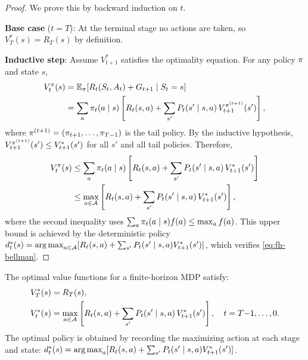 \documentclass[11pt,a4paper]{article}
\begin{document}
\begin{proof}
We prove this by backward induction on $t$.

\textbf{Base case} ($t = T$): At the terminal stage no actions are
taken, so $V_T^*(s) = R_T(s)$ by definition.

\textbf{Inductive step}: Assume $V_{t+1}^*$ satisfies the optimality
equation. For any policy $\pi$ and state $s$,
\begin{align*}
    V_t^\pi(s)
    &= \mathbb{E}_\pi[R_t(S_t, A_t) + G_{t+1} \mid S_t = s] \\
    &= \sum_{a} \pi_t(a \mid s) \left[ R_t(s,a)
       + \sum_{s'} P_t(s' \mid s,a)\,
       V_{t+1}^{\pi^{(t+1)}}(s') \right],
\end{align*}
where $\pi^{(t+1)} = (\pi_{t+1}, \ldots, \pi_{T-1})$ is
the tail policy. By the inductive hypothesis,
$V_{t+1}^{\pi^{(t+1)}}(s') \leq V_{t+1}^*(s')$ for all $s'$
and all tail policies. Therefore,
\begin{align*}
    V_t^\pi(s)
    &\leq \sum_{a} \pi_t(a \mid s) \left[ R_t(s,a)
       + \sum_{s'} P_t(s' \mid s,a)\, V_{t+1}^*(s') \right] \\
    &\leq \max_{a \in \mathcal{A}} \left[ R_t(s,a)
       + \sum_{s'} P_t(s' \mid s,a)\, V_{t+1}^*(s') \right],
\end{align*}
where the second inequality uses
$\sum_a \pi_t(a \mid s) f(a) \leq \max_a f(a)$. This upper
bound is achieved by the deterministic policy
$d_t^*(s) = \operatorname{arg\,max}_{a \in \mathcal{A}} [R_t(s,a) + \sum_{s'}
P_t(s' \mid s,a) V_{t+1}^*(s')]$, which verifies
\eqref{eq:fh-bellman}.
\end{proof}

\begin{keyresult}[title={Finite-Horizon Bellman Optimality Recursion}]
The optimal value functions for a finite-horizon MDP satisfy:
\begin{align*}
    V_T^*(s) &= R_T(s), \\
    V_t^*(s) &= \max_{a \in \mathcal{A}} \left[ R_t(s,a) + \sum_{s'}
    P_t(s' \mid s,a)\, V_{t+1}^*(s') \right],
    \quad t = T{-}1, \ldots, 0.
\end{align*}
The optimal policy is obtained by recording the maximizing action at
each stage and state: $d_t^*(s) = \operatorname{arg\,max}_{a} [R_t(s,a) + \sum_{s'}
P_t(s' \mid s,a) V_{t+1}^*(s')]$.
\end{keyresult}

\end{document}
